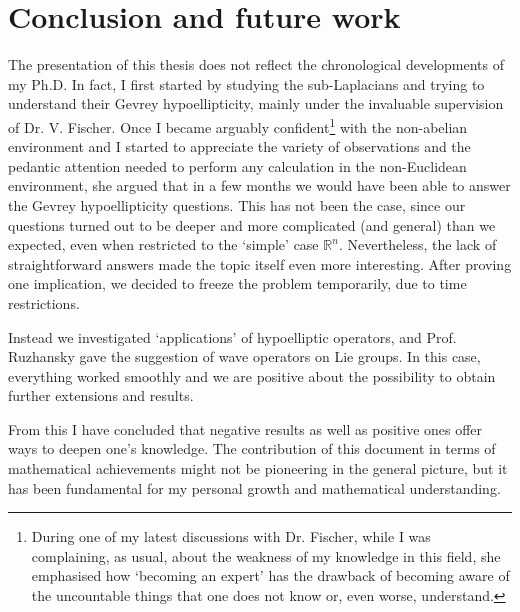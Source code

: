\documentclass[12pt,oneside,a4paper]{book}
\numberwithin{equation}{section}     %
\theoremstyle{plain}
\theoremstyle{definition}
\newcommand{\R}{{\mathbb R}}
\newcommand{\Rn}{{\R}^n}
\begin{document}

\chapter{Conclusion and future work}\label{CP:5}

The presentation of this thesis does not reflect the chronological developments of my Ph.D. In fact, I first started by studying the sub-Laplacians and trying to understand their Gevrey hypoellipticity, mainly under the invaluable supervision of Dr. V. Fischer. Once I became arguably confident\footnote{During one of my latest discussions with Dr. Fischer, while I was complaining, as usual, about the weakness of my knowledge in this field, she emphasised how `becoming an expert' has the drawback of becoming aware of the uncountable things that one does not know or, even worse, understand. } with the non-abelian environment and I started to appreciate the variety of observations and the pedantic attention needed to perform any calculation in the non-Euclidean environment, she argued that in a few months we would have been able to answer the Gevrey hypoellipticity questions. This has not been the case, since our questions turned out to be deeper and more complicated (and general) than we expected, even when restricted to the `simple' case $\Rn$. Nevertheless, the lack of straightforward answers made the topic itself even more interesting. After proving one implication, we decided to freeze the problem temporarily, due to time restrictions.


Instead we investigated `applications' of hypoelliptic operators, and Prof. Ruzhansky gave the suggestion of wave operators on Lie groups. In this case, everything worked smoothly and we are positive about the possibility to obtain further extensions and results.

From this I have concluded that negative results as well as positive ones offer ways to deepen one's knowledge. The contribution of this document in terms of mathematical achievements might not be pioneering in the general picture, but it has been fundamental for my personal growth and mathematical understanding.
\end{document}

